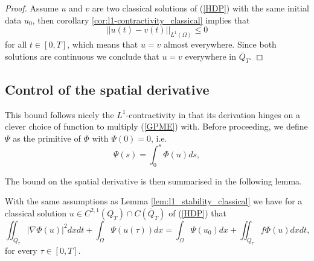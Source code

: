 \documentclass[11pt, a4paper]{article}
\begin{document}
\begin{proof}
Assume $u$ and $v$ are two classical solutions of (\ref{HDP}) with the same initial data $u_0$, then corollary \ref{cor:l1-contractivity_classical} implies that
\begin{equation*}
||u(t)-v(t)||_{L^1(\Omega)} \leq 0
\end{equation*}
for all $t \in [0,T]$, which means that $u=v$ almost everywhere. Since both solutions are continuous we conclude that $u=v$ everywhere in $\overline{Q}_T$.
\end{proof}

\subsection{Control of the spatial derivative}
This bound follows nicely the $L^1$-contractivity in that its derivation hinges on a clever choice of function to multiply (\ref{GPME}) with. Before proceeding, we define  $\Psi$ as the primitive of $\Phi$ with $\Psi(0) = 0$, i.e.
\begin{equation}
\label{phi_primitive}
	\Psi(s) = \int_0^s \Phi(u) ds,
\end{equation}

The bound on the spatial derivative is then summarised in the following lemma.

\begin{lemma}
\label{lem:Energy_equality_classical}
With the same assumptions as Lemma \ref{lem:l1_stability_classical} we have for a classical solution $u\in C^{2,1}(Q_T) \cap C(\overline{Q}_T)$ of (\ref{HDP}) that
\begin{equation}
\label{spatial_derivative_bound}
\iint_{Q_\tau} |\nabla \Phi(u)|^2dxdt + \int_\Omega \Psi(u(\tau))dx = \int_\Omega \Psi(u_0)dx + \iint_{Q_\tau} f\Phi(u)dxdt,
\end{equation}
for every $\tau \in [0,T]$.
\end{lemma}
\end{document}
